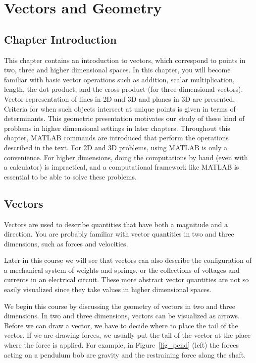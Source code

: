 \chapter{Vectors and Geometry}


\section{Chapter Introduction}

This chapter contains an introduction to vectors, which correspond to
points in two, three and higher dimensional spaces. In this chapter,
you will become familiar with basic vector operations such as
addition, scalar multiplication, length, the dot product, and the
cross product (for three dimensional vectors). Vector representation
of lines in 2D and 3D and planes in 3D are presented. Criteria for when
such objects intersect at unique points is given in terms of
determinants. This geometric presentation motivates our study of these
kind of problems in higher dimensional settings in later
chapters. Throughout this chapter, MATLAB commands are introduced that
perform the operations described in the text. For 2D and 3D problems,
using MATLAB is only a convenience. For higher dimensions, doing the
computations by hand (even with a calculator) is impractical, and a
computational framework like MATLAB is essential to be able to solve
these problems.


\section{Vectors}

Vectors are used to describe quantities that have both a magnitude and
a direction. You are probably familiar with vector quantities in two
and three dimensions, such as forces and velocities.

Later in this course we will see that vectors can also describe the
configuration of a mechanical system of weights and springs, or the
collections of voltages and currents in an electrical circuit.  These
more abstract vector quantities are not so easily visualized since
they take values in higher dimensional spaces.

We begin this course by discussing the geometry of vectors in two and
three dimensions.  In two and three dimensions, vectors can be
visualized as arrows. Before we can draw a vector, we have to decide
where to place the tail of the vector.  If we are drawing forces, we
usually put the tail of the vector at the place where the force is
applied. For example, in Figure~\ref{fig_pend} (left) 
the forces acting on a pendulum
bob are gravity and the restraining force along the shaft.

